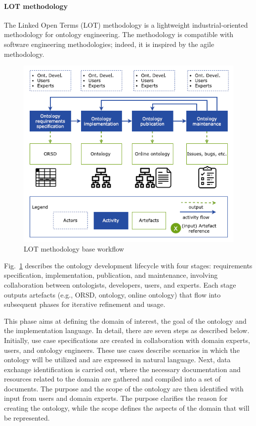 \paragraph{LOT methodology}
The Linked Open Terms (LOT) methodology \cite{poveda2022lot} is a lightweight industrial-oriented methodology for ontology engineering.
The methodology is compatible with software engineering methodologies; indeed, it is inspired by the agile methodology.
\begin{figure}[H]
    \centering
    \includegraphics[width=0.7\linewidth]{Figures/fig_3.png}
    \caption{LOT methodology base workflow}
    \label{fig:lot-workflow}
\end{figure}

Fig.~\ref{fig:lot-workflow} describes the ontology development lifecycle with four stages: requirements specification, implementation, publication, and maintenance, involving collaboration between ontologists, developers, users, and experts.
Each stage outputs artefacts (e.g., ORSD, ontology, online ontology) that flow into subsequent phases for iterative refinement and usage.

This phase aims at defining the domain of interest, the goal of the ontology and the implementation language.
In detail, there are seven steps as described below.
Initially, use case specifications are created in collaboration with domain experts, users, and ontology engineers.
These use cases describe scenarios in which the ontology will be utilized and are expressed in natural language.
Next, data exchange identification is carried out, where the necessary documentation and resources related to the domain are gathered and compiled into a set of documents.
The purpose and the scope of the ontology are then identified with input from users and domain experts.
The purpose clarifies the reason for creating the ontology, while the scope defines the aspects of the domain that will be represented.

